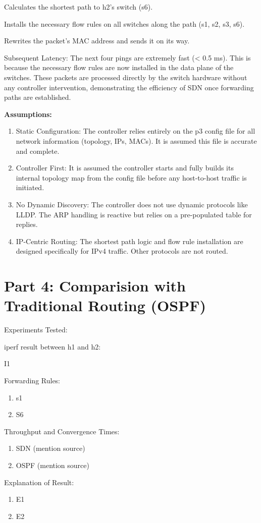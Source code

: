 \documentclass[12pt]{article}
\begin{document}
Calculates the shortest path to h2's switch (s6).

Installs the necessary flow rules on all switches along the path (s1, s2, s3, s6).

Rewrites the packet's MAC address and sends it on its way.

Subsequent Latency: The next four pings are extremely fast (< 0.5 ms). This is because the necessary flow rules are now installed in the data plane of the switches. These packets are processed directly by the switch hardware without any controller intervention, demonstrating the efficiency of SDN once forwarding paths are established.

\textbf{Assumptions:}
\begin{enumerate}
    \item Static Configuration: The controller relies entirely on the p3 config file for all network information (topology, IPs, MACs). It is assumed this file is accurate and complete.

    \item Controller First: It is assumed the controller starts and fully builds its internal topology map from the config file before any host-to-host traffic is initiated.

    \item No Dynamic Discovery: The controller does not use dynamic protocols like LLDP. The ARP handling is reactive but relies on a pre-populated table for replies.

    \item IP-Centric Routing: The shortest path logic and flow rule installation are designed specifically for IPv4 traffic. Other protocols are not routed.
\end{enumerate}


\section{Part 4: Comparision with Traditional Routing (OSPF)}

Experiments Tested:

iperf result between h1 and h2:

I1

Forwarding Rules:
\begin{enumerate}
    \item s1
    \item S6
\end{enumerate}

Throughput and Convergence Times:
\begin{enumerate}
    \item SDN (mention source)
    \item OSPF (mention source)
\end{enumerate}

Explanation of Result:
\begin{enumerate}
    \item E1 
    \item E2
\end{enumerate}

\end{document}
